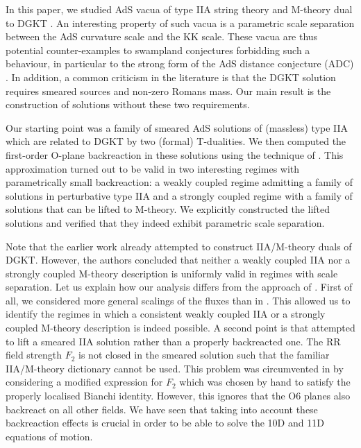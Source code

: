 \documentclass[11pt]{article}
\renewcommand{\[}{\left[}
\renewcommand{\]}{\right]}
\renewcommand{\(}{\left(}
\renewcommand{\)}{\right)}
\newcommand{\<}{\langle}
\renewcommand{\>}{\rangle}
\begin{document}
In this paper, we studied AdS vacua of type IIA string theory and M-theory dual to DGKT \cite{DeWolfe:2005uu}.
An interesting property of such vacua is a parametric scale separation between the AdS curvature scale and the KK scale. These vacua are thus potential counter-examples to swampland conjectures forbidding such a behaviour, in particular to the strong form of the AdS distance conjecture (ADC) \cite{Lust:2019zwm}.
In addition, a common criticism in the literature is that the DGKT solution requires smeared sources and non-zero Romans mass.
Our main result is the construction of solutions without these two requirements.

Our starting point was a family of smeared AdS solutions of (massless) type IIA \cite{Caviezel:2008ik} which are related to DGKT by two (formal) T-dualities.
We then computed the first-order O-plane backreaction in these solutions using the technique of \cite{Junghans:2020acz}.
This approximation turned out to be valid in two interesting regimes with parametrically small backreaction: a weakly coupled regime admitting a family of solutions in perturbative type IIA and a strongly coupled regime with a family of solutions that can be lifted to M-theory. We explicitly constructed the lifted solutions and verified that they indeed exhibit parametric scale separation.

Note that the earlier work \cite{Banks:2006hg} already attempted to construct IIA/M-theory duals of DGKT. However, the authors concluded that neither a weakly coupled IIA nor a strongly coupled M-theory description is uniformly valid in regimes with scale separation.
Let us explain how our analysis differs from the approach of \cite{Banks:2006hg}.
First of all, we considered more general scalings of the fluxes than in \cite{Banks:2006hg}. This allowed us to identify the regimes in which a consistent weakly coupled IIA or a strongly coupled M-theory description is indeed possible.
A second point is that \cite{Banks:2006hg} attempted to lift a smeared IIA solution rather than a properly backreacted one.
The RR field strength $F_2$ is not closed in the smeared solution such that the familiar IIA/M-theory dictionary cannot be used. This problem was circumvented in \cite{Banks:2006hg} by considering a modified expression for $F_2$ which was chosen by hand to satisfy the properly localised Bianchi identity.
However, this ignores that the O6 planes also backreact on all other fields. We have seen that taking into account these backreaction effects is crucial in order to be able to solve the 10D and 11D equations of motion.
\end{document}

